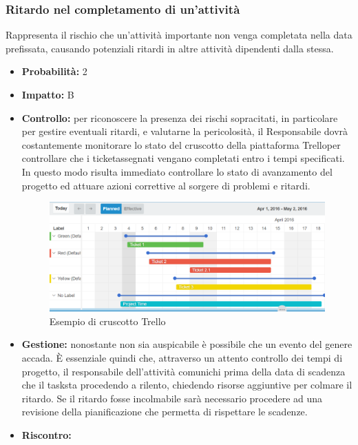 \documentclass[a4paper,11pt]{article}
\begin{document}
		\subsubsection{Ritardo nel completamento di un'attività}
		Rappresenta il rischio che un'attività importante non venga completata nella data prefissata, causando potenziali ritardi in altre attività dipendenti dalla stessa.
		\begin{itemize}
		\item \textbf{Probabilità:} 2
		\item \textbf{Impatto:} B
		\item \textbf{Controllo:} per riconoscere la presenza dei rischi sopracitati, in particolare per gestire eventuali ritardi, e valutarne la pericolosità, il Responsabile dovrà costantemente monitorare lo stato del cruscotto della piattaforma Trello\addglos per controllare che i ticket\addglos assegnati vengano completati entro i tempi specificati. In questo modo risulta immediato controllare lo stato di avanzamento del progetto ed attuare azioni correttive al sorgere di problemi e ritardi.
		\begin{figure}[h!]
		\begin{center}
			\hspace{1cm}
			\includegraphics[scale=0.35]{../Images/ticketing-example.png}
			\caption{Esempio di cruscotto Trello}	
		\end{center}
		\end{figure}	
		\item \textbf{Gestione:} nonostante non sia auspicabile è possibile che un evento del genere accada. È essenziale quindi che, attraverso un attento controllo dei tempi di progetto, il responsabile dell'attività comunichi prima della data di scadenza che  il task\addglos sta procedendo a rilento, chiedendo risorse aggiuntive per colmare il ritardo. Se il ritardo fosse incolmabile sarà necessario procedere ad una revisione della pianificazione che permetta di rispettare le scadenze.
		\item \textbf{Riscontro:}

\end{itemize}
\end{document}
